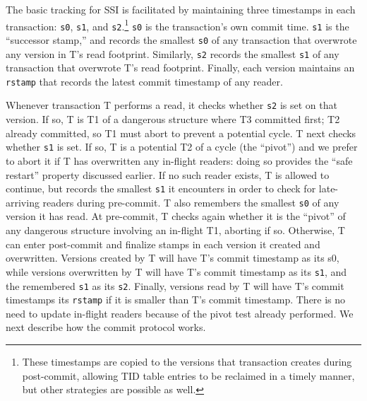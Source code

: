 The basic tracking for SSI is facilitated by maintaining three timestamps in each transaction: \texttt{s0}, \texttt{s1}, and \texttt{s2}.\footnote{These timestamps are copied to the versions that transaction creates during post-commit, allowing TID table entries to be reclaimed in a timely manner, but other strategies are possible as well.} \texttt{s0} is the transaction's own commit time. \texttt{s1} is the ``successor stamp,'' and records the smallest \texttt{s0} of any transaction that overwrote any version in T's read footprint. Similarly, \texttt{s2} records the smallest \texttt{s1} of any transaction that overwrote T's read footprint. Finally, each version maintains an \texttt{rstamp} that records the latest commit timestamp of any reader.

Whenever transaction T performs a read, it checks whether \texttt{s2} is set on that version. If so, T is T1 of a dangerous structure where T3 committed first; T2 already committed, so T1 must abort to prevent a potential cycle. T next checks whether \texttt{s1} is set. If so, T is a potential T2 of a cycle (the ``pivot'') and we prefer to abort it if T has overwritten any in-flight readers: doing so provides the ``safe restart'' property discussed earlier. If no such reader exists, T is allowed to continue, but records the smallest \texttt{s1} it encounters in order to check for late-arriving readers during pre-commit. T also remembers the smallest \texttt{s0} of any version it has read. At pre-commit, T checks again whether it is the ``pivot'' of any dangerous structure involving an in-flight T1, aborting if so. Otherwise, T can enter post-commit and finalize stamps in each version it created and overwritten. Versions created by T will have T's commit timestamp as its s0, while versions overwritten by T will have T's commit timestamp as its \texttt{s1}, and the remembered \texttt{s1} as its \texttt{s2}. Finally, versions read by T will have T's commit timestamps its \texttt{rstamp} if it is smaller than T's commit timestamp. There is no need to update in-flight readers because of the pivot test already performed. We next describe how the commit protocol works.

